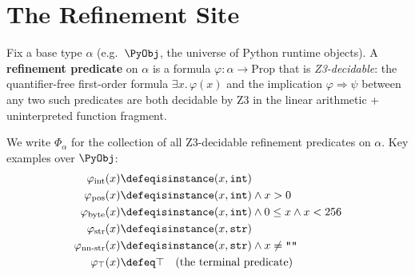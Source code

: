 \section{The Refinement Site}
\label{sec:refinement-site}

\begin{definition}
\label{def:refinement-predicate}
Fix a base type $\alpha$ (e.g.\ $\PyObj$, the universe of Python runtime
objects).  A \textbf{refinement predicate} on $\alpha$ is a formula
$\varphi : \alpha \to \mathrm{Prop}$ that is \emph{Z3-decidable}: the
quantifier-free first-order formula $\exists x.\,\varphi(x)$ and the
implication $\varphi \Rightarrow \psi$ between any two such predicates
are both decidable by Z3 in the linear arithmetic + uninterpreted function
fragment.

We write $\Phi_\alpha$ for the collection of all Z3-decidable refinement
predicates on $\alpha$.  Key examples over $\PyObj$:
\begin{align*}
\varphi_{\mathrm{int}}(x) &\defeq \mathtt{isinstance}(x, \mathtt{int}) \\
\varphi_{\mathrm{pos}}(x) &\defeq \mathtt{isinstance}(x, \mathtt{int})
  \wedge x > 0 \\
\varphi_{\mathrm{byte}}(x) &\defeq \mathtt{isinstance}(x, \mathtt{int})
  \wedge 0 \le x \wedge x < 256 \\
\varphi_{\mathrm{str}}(x) &\defeq \mathtt{isinstance}(x, \mathtt{str}) \\
\varphi_{\mathrm{nn\mathchar`-str}}(x) &\defeq \mathtt{isinstance}(x,
  \mathtt{str}) \wedge x \ne \texttt{""} \\
\varphi_{\top}(x) &\defeq \top \quad\text{(the terminal predicate)}
\end{align*}
\end{definition}

